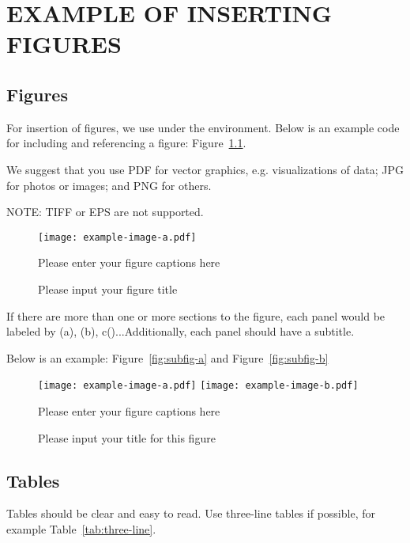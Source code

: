 
\chapter{EXAMPLE OF INSERTING FIGURES}

\section{Figures}

For insertion of figures, we use  under the  environment. Below is an example code for including and referencing a figure: Figure~\ref{fig:example}.

We suggest that you use PDF for vector graphics, e.g. visualizations of data; JPG for photos or images; and PNG for others.

NOTE: TIFF or EPS are not supported.

\begin{figure}
  \centering
  \texttt{[image: example-image-a.pdf]}
  \caption{Please input your figure title}
  {Please enter your figure captions here}
  \label{fig:example}
\end{figure}

If there are more than one or more sections to the figure, each panel would be labeled by (a), (b), c()...Additionally, each panel should have a subtitle.

Below is an example: Figure~\ref{fig:subfig-a} and Figure~\ref{fig:subfig-b}


\begin{figure}
  \centering
    {\texttt{[image: example-image-a.pdf]}}
    {\texttt{[image: example-image-b.pdf]}}
  \caption{Please input your title for this figure}
  {Please enter your figure captions here}
  \label{fig:multi-image}
\end{figure}



\section{Tables}

Tables should be clear and easy to read. Use three-line tables if possible, for example Table~\ref{tab:three-line}.

